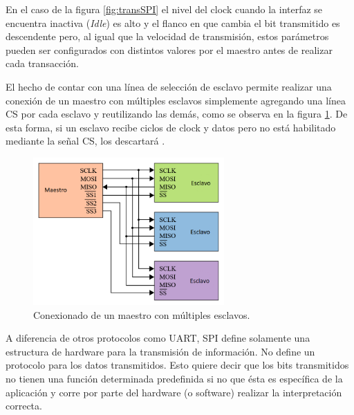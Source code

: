 En el caso de la figura \ref{fig:transSPI} el nivel del clock cuando la interfaz se encuentra inactiva (\textit{Idle}) es alto y el flanco en que cambia el bit transmitido es descendente pero, al igual que la velocidad de transmisión, estos parámetros pueden ser configurados con distintos valores por el maestro antes de realizar cada transacción.

El hecho de contar con una línea de selección de esclavo permite realizar una conexión de un maestro con múltiples esclavos simplemente agregando una línea CS por cada esclavo y reutilizando las demás, como se observa en la figura \ref{fig:multiSlave}. De esta forma, si un esclavo recibe ciclos de clock y datos pero no está habilitado mediante la señal CS, los descartará \citep{WEBSITE:SPI}.

\begin{figure}[H]
\centering
\includegraphics[width=0.65\textwidth]{./Figures/multiSlave.png}
\caption{Conexionado de un maestro con múltiples esclavos.}
\label{fig:multiSlave}
\end{figure}

A diferencia de otros protocolos como UART, SPI define solamente una estructura de hardware para la transmisión de información. No define un protocolo para los datos transmitidos. Esto quiere decir que los bits transmitidos no tienen una función determinada predefinida si no que ésta es específica de la aplicación y corre por parte del hardware (o software) realizar la interpretación correcta.
